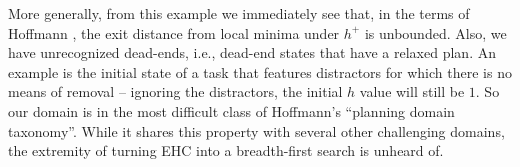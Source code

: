 


More generally, from this example we immediately see that, in the
terms of Hoffmann , the exit distance from
local minima under $h^+$ is unbounded. Also, we have unrecognized
dead-ends, i.e., dead-end states that have a relaxed plan. An example
is the initial state of a task that features distractors for which
there is no means of removal -- ignoring the distractors, the initial
$h$ value will still be $1$. So our domain is in the most difficult
class of Hoffmann's  ``planning domain
taxonomy''. While it shares this property with several other
challenging domains, the extremity of turning EHC into a breadth-first
search is unheard of.





